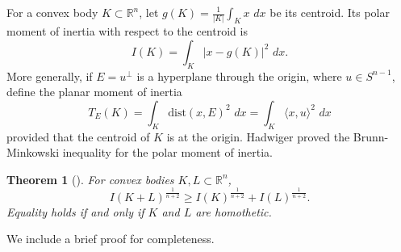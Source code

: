 \documentclass[12pt,leqno]{amsart}
\theoremstyle{plain} \newtheorem{thm}{Theorem}[section]
\theoremstyle{plain} \newtheorem{prop}[thm]{Proposition}
\theoremstyle{plain} \newtheorem{prob}[thm]{Problem}
\theoremstyle{definition} \newtheorem{defi}[thm]{Definition}
\theoremstyle{plain} \newtheorem{cor}[thm]{Corollary}
\theoremstyle{plain} \newtheorem{lem}[thm]{Lemma}
\theoremstyle{plain} \newtheorem{eg}{Example}[section]
\theoremstyle{remark} \newtheorem{rmk}[thm]{Remark}
\theoremstyle{plain} \newtheorem{conj}{Conjecture}
\numberwithin{equation}{section}
\newcommand{\dist}{\mathrm{dist}}
\newcommand{\dd}{\,d}
\newcommand{\R}{\mathbb{R}}
\begin{document}
For a convex body $K\subset \R^n$, let $g(K)=\frac{1}{|K|}\int_K x\,\dd x$ be its centroid. Its polar moment of inertia with respect to the centroid is
\[
    I(K)=\int_K |x-g(K)|^2\,\dd x.
\]
More generally, if $E=u^\perp$ is a hyperplane through the origin, where $u\in S^{n-1}$, define the planar moment of inertia
\[
    T_E(K)=\int_K \dist(x,E)^2\,\dd x=\int_K \langle x,u\rangle^2\,\dd x
\]
provided that the centroid of $K$ is at the origin. Hadwiger \cite{Had56} proved the Brunn-Minkowski inequality for the polar moment of inertia.

\begin{thm}[\cite{Had56}]\label{thm-Hadwiger}
For convex bodies $K,L\subset\R^n$,
\[
    I(K+L)^{\frac1{n+2}}\ge I(K)^{\frac1{n+2}}+I(L)^{\frac1{n+2}}.
\]
Equality holds if and only if $K$ and $L$ are homothetic.
\end{thm}

We include a brief proof for completeness.
\end{document}
